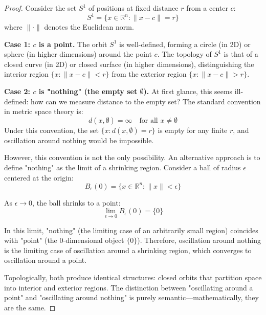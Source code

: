 \documentclass[12pt,a4paper]{article}
\theoremstyle{definition}
\theoremstyle{remark}
\begin{document}
\begin{proof}
Consider the set $S^1$ of positions at fixed distance $r$ from a center $c$:
\begin{equation}
S^1 = \{x \in \mathbb{R}^n : \|x - c\| = r\}
\end{equation}
where $\|\cdot\|$ denotes the Euclidean norm.

\textbf{Case 1: $c$ is a point.}
The orbit $S^1$ is well-defined, forming a circle (in 2D) or sphere (in higher dimensions) around the point $c$. The topology of $S^1$ is that of a closed curve (in 2D) or closed surface (in higher dimensions), distinguishing the interior region $\{x : \|x - c\| < r\}$ from the exterior region $\{x : \|x - c\| > r\}$.

\textbf{Case 2: $c$ is "nothing" (the empty set $\emptyset$).}
At first glance, this seems ill-defined: how can we measure distance to the empty set? The standard convention in metric space theory is:
\begin{equation}
d(x, \emptyset) = \infty \quad \text{for all } x \neq \emptyset
\end{equation}
Under this convention, the set $\{x : d(x, \emptyset) = r\}$ is empty for any finite $r$, and oscillation around nothing would be impossible.

However, this convention is not the only possibility. An alternative approach is to define "nothing" as the limit of a shrinking region. Consider a ball of radius $\epsilon$ centered at the origin:
\begin{equation}
B_\epsilon(0) = \{x \in \mathbb{R}^n : \|x\| < \epsilon\}
\end{equation}

As $\epsilon \to 0$, the ball shrinks to a point:
\begin{equation}
\lim_{\epsilon \to 0} B_\epsilon(0) = \{0\}
\end{equation}

In this limit, "nothing" (the limiting case of an arbitrarily small region) coincides with "point" (the 0-dimensional object $\{0\}$). Therefore, oscillation around nothing is the limiting case of oscillation around a shrinking region, which converges to oscillation around a point.

Topologically, both produce identical structures: closed orbits that partition space into interior and exterior regions. The distinction between "oscillating around a point" and "oscillating around nothing" is purely semantic—mathematically, they are the same.
\end{proof}
\end{document}
